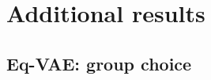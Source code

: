 \section{Additional results} \label{appx:additional_exp}
\subsection{Eq-VAE: group choice}\label{appx:eq_vae_group}

